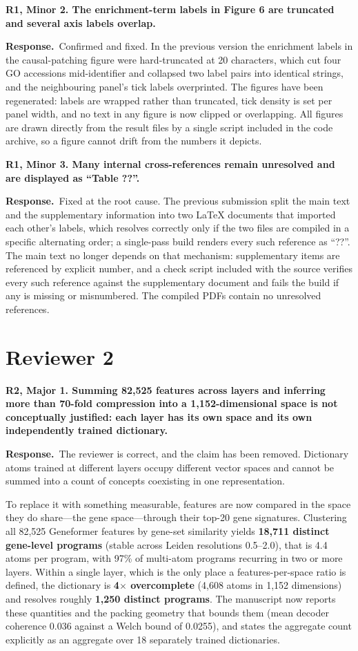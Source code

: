 \documentclass[11pt]{article}
\newcommand{\point}[1]{\vspace{0.7em}\noindent\textbf{#1}\par\vspace{0.15em}}
\newcommand{\reply}{\par\vspace{0.3em}\noindent\textbf{Response.}\ }
\begin{document}
\point{R1, Minor 2. The enrichment-term labels in Figure 6 are truncated and several axis labels
overlap.}
\reply Confirmed and fixed. In the previous version the enrichment labels in the causal-patching
figure were hard-truncated at 20 characters, which cut four GO accessions mid-identifier and
collapsed two label pairs into identical strings, and the neighbouring panel's tick labels
overprinted. The figures have been regenerated: labels are wrapped rather than truncated, tick
density is set per panel width, and no text in any figure is now clipped or overlapping. All
figures are drawn directly from the result files by a single script included in the code archive,
so a figure cannot drift from the numbers it depicts.

\point{R1, Minor 3. Many internal cross-references remain unresolved and are displayed as
``Table ??''.}
\reply Fixed at the root cause. The previous submission split the main text and the supplementary
information into two LaTeX documents that imported each other's labels, which resolves correctly
only if the two files are compiled in a specific alternating order; a single-pass build renders
every such reference as ``??''. The main text no longer depends on that mechanism: supplementary
items are referenced by explicit number, and a check script included with the source verifies every
such reference against the supplementary document and fails the build if any is missing or
misnumbered. The compiled PDFs contain no unresolved references.

\section*{Reviewer 2}

\point{R2, Major 1. Summing 82,525 features across layers and inferring more than 70-fold
compression into a 1,152-dimensional space is not conceptually justified: each layer has its own
space and its own independently trained dictionary.}
\reply The reviewer is correct, and the claim has been removed. Dictionary atoms trained at
different layers occupy different vector spaces and cannot be summed into a count of concepts
coexisting in one representation.

To replace it with something measurable, features are now compared in the space they do share---the
gene space---through their top-20 gene signatures. Clustering all 82,525 Geneformer features by
gene-set similarity yields \textbf{18,711 distinct gene-level programs} (stable across Leiden
resolutions 0.5--2.0), that is 4.4 atoms per program, with 97\% of multi-atom programs recurring in
two or more layers. Within a single layer, which is the only place a features-per-space ratio is
defined, the dictionary is \textbf{4$\times$ overcomplete} (4,608 atoms in 1,152 dimensions) and
resolves roughly \textbf{1,250 distinct programs}. The manuscript now reports these quantities and
the packing geometry that bounds them (mean decoder coherence 0.036 against a Welch bound of
0.0255), and states the aggregate count explicitly as an aggregate over 18 separately trained
dictionaries.
\end{document}

